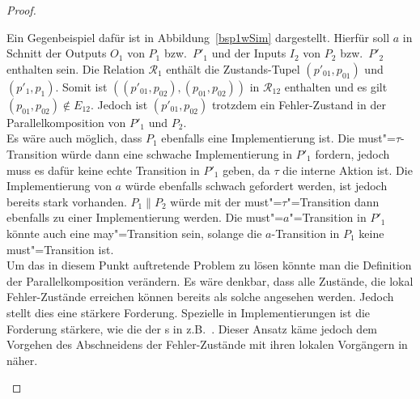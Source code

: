 \begin{proof}
\begin{enumerate}
      Ein Gegenbeispiel dafür ist in Abbildung~\ref{bsp1wSim} dargestellt.
      Hierfür soll $a$ in Schnitt der Outputs $O_1$ von $P_1$ bzw.\ $P'_1$ und
      der Inputs $I_2$ von $P_2$ bzw.\ $P'_2$ enthalten sein. Die Relation
      $\mathcal{R}_1$ enthält die Zustands-Tupel $(p'_{01},p_{01})$ und
      $(p'_1,p_1)$. Somit ist $((p'_{01},p_{02}),(p_{01},p_{02}))$ in
      $\mathcal{R}_{12}$ enthalten und es gilt $(p_{01},p_{02})\notin E_{12}$.
      Jedoch ist $(p'_{01},p_{02})$ trotzdem ein Fehler-Zustand in der
      Parallelkomposition von $P'_1$ und $P_2$.\\
      Es wäre auch möglich, dass $P_1$ ebenfalls eine Implementierung ist. Die
      must"=$\tau$-Transition würde dann eine schwache Implementierung in
      $P'_1$ fordern, jedoch muss es dafür keine echte Transition in $P'_1$
      geben, da $\tau$ die interne Aktion ist. Die Implementierung von $a$
      würde ebenfalls schwach gefordert werden, ist jedoch bereits stark
      vorhanden. $P_1\|P_2$ würde mit der must"=$\tau$"=Transition dann
      ebenfalls zu einer Implementierung werden. Die must"=$a$"=Transition in
      $P'_1$ könnte auch eine may"=Transition sein, solange die $a$-Transition
      in $P_1$ keine must"=Transition ist.\\
      Um das in diesem Punkt auftretende Problem zu lösen könnte man die
      Definition der Parallelkomposition verändern. Es wäre denkbar, dass alle
      Zustände, die lokal Fehler-Zustände erreichen können bereits als solche
      angesehen werden. Jedoch stellt dies eine stärkere Forderung. Spezielle
      in Implementierungen ist die Forderung stärkere, wie die der \EIO{}s in
      z.B.~\cite{Schinko2016BA}. Dieser Ansatz käme jedoch dem Vorgehen des
      Abschneidens der Fehler-Zustände mit ihren lokalen Vorgängern
      in~\cite{Vogler2016MIA3} näher.

    \begin{figure}[htbp]
      \begin{center}
\end{center}
\end{figure}
\end{enumerate}
\end{proof}
